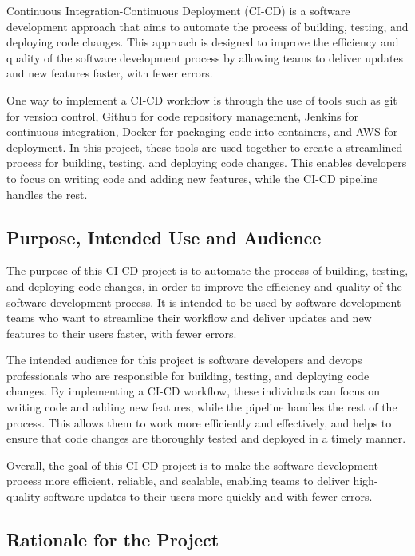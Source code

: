 \documentclass[
  10pt,
  paper=a4,
  ,captions=tableheading
]{scrartcl}
\begin{document}
Continuous Integration-Continuous Deployment (CI-CD) is a software
development approach that aims to automate the process of building,
testing, and deploying code changes. This approach is designed to
improve the efficiency and quality of the software development process
by allowing teams to deliver updates and new features faster, with fewer
errors.

One way to implement a CI-CD workflow is through the use of tools such
as git for version control, Github for code repository management,
Jenkins for continuous integration, Docker for packaging code into
containers, and AWS for deployment. In this project, these tools are
used together to create a streamlined process for building, testing, and
deploying code changes. This enables developers to focus on writing code
and adding new features, while the CI-CD pipeline handles the rest.

\hypertarget{purpose-intended-use-and-audience}{%
\subsection{Purpose, Intended Use and
Audience}\label{purpose-intended-use-and-audience}}

The purpose of this CI-CD project is to automate the process of
building, testing, and deploying code changes, in order to improve the
efficiency and quality of the software development process. It is
intended to be used by software development teams who want to streamline
their workflow and deliver updates and new features to their users
faster, with fewer errors.

The intended audience for this project is software developers and devops
professionals who are responsible for building, testing, and deploying
code changes. By implementing a CI-CD workflow, these individuals can
focus on writing code and adding new features, while the pipeline
handles the rest of the process. This allows them to work more
efficiently and effectively, and helps to ensure that code changes are
thoroughly tested and deployed in a timely manner.

Overall, the goal of this CI-CD project is to make the software
development process more efficient, reliable, and scalable, enabling
teams to deliver high-quality software updates to their users more
quickly and with fewer errors.

\hypertarget{rationale-for-the-project}{%
\subsection{Rationale for the Project}\label{rationale-for-the-project}}
\end{document}

